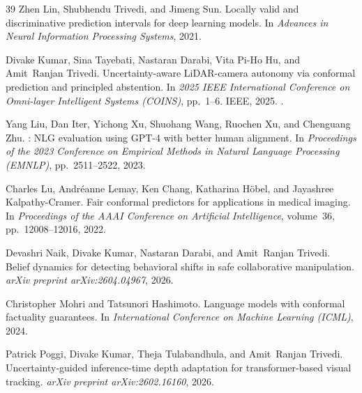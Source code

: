 \documentclass{article}
\begin{document}
\begin{thebibliography}{39}
Zhen Lin, Shubhendu Trivedi, and Jimeng Sun.
\newblock Locally valid and discriminative prediction intervals for deep learning models.
\newblock In \emph{Advances in Neural Information Processing Systems}, 2021.

Divake Kumar, Sina Tayebati, Nastaran Darabi, Vita Pi-Ho Hu, and Amit~Ranjan Trivedi.
\newblock Uncertainty-aware {LiDAR}-camera autonomy via conformal prediction and principled abstention.
\newblock In \emph{2025 IEEE International Conference on Omni-layer Intelligent Systems (COINS)}, pp.\  1--6. IEEE, 2025{}.
\newblock {}.

Yang Liu, Dan Iter, Yichong Xu, Shuohang Wang, Ruochen Xu, and Chenguang Zhu.
: {NLG} evaluation using {GPT-4} with better human alignment.
\newblock In \emph{Proceedings of the 2023 Conference on Empirical Methods in Natural Language Processing (EMNLP)}, pp.\  2511--2522, 2023.

Charles Lu, Andr{\'e}anne Lemay, Ken Chang, Katharina H{\"o}bel, and Jayashree Kalpathy-Cramer.
\newblock Fair conformal predictors for applications in medical imaging.
\newblock In \emph{Proceedings of the AAAI Conference on Artificial Intelligence}, volume~36, pp.\  12008--12016, 2022.

Devashri Naik, Divake Kumar, Nastaran Darabi, and Amit~Ranjan Trivedi.
\newblock Belief dynamics for detecting behavioral shifts in safe collaborative manipulation.
\newblock \emph{arXiv preprint arXiv:2604.04967}, 2026.

Christopher Mohri and Tatsunori Hashimoto.
\newblock Language models with conformal factuality guarantees.
\newblock In \emph{International Conference on Machine Learning (ICML)}, 2024.

Patrick Poggi, Divake Kumar, Theja Tulabandhula, and Amit~Ranjan Trivedi.
\newblock Uncertainty-guided inference-time depth adaptation for transformer-based visual tracking.
\newblock \emph{arXiv preprint arXiv:2602.16160}, 2026.


\end{thebibliography}
\end{document}
